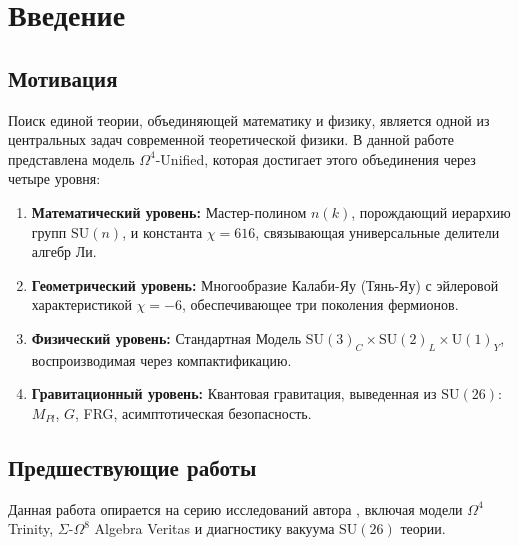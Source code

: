 \documentclass[12pt,a4paper,twoside]{article}
\newcommand{\SU}{\mathrm{SU}}
\newcommand{\Uone}{\mathrm{U}(1)}
\theoremstyle{definition}
\begin{document}
\newpage

\tableofcontents
\newpage

\section{Введение}
\label{sec:intro}

\subsection{Мотивация}

Поиск единой теории, объединяющей математику и физику, является одной из центральных задач современной теоретической физики. В данной работе представлена модель $\Omega^4$-Unified, которая достигает этого объединения через четыре уровня:

\begin{enumerate}
    \item \textbf{Математический уровень:} Мастер-полином $n(k)$, порождающий иерархию групп $\SU(n)$, и константа $\chi = 616$, связывающая универсальные делители алгебр Ли.
    
    \item \textbf{Геометрический уровень:} Многообразие Калаби-Яу (Тянь-Яу) с эйлеровой характеристикой $\chi = -6$, обеспечивающее три поколения фермионов.
    
    \item \textbf{Физический уровень:} Стандартная Модель $\SU(3)_C \times \SU(2)_L \times \Uone_Y$, воспроизводимая через компактификацию.
    
    \item \textbf{Гравитационный уровень:} Квантовая гравитация, выведенная из $\SU(26)$: $M_{Pl}$, $G$, FRG, асимптотическая безопасность.
\end{enumerate}

\subsection{Предшествующие работы}

Данная работа опирается на серию исследований автора \cite{Matershov:2026a, Matershov:2026b, Matershov:2026c, Matershov:2026d, Matershov:2026e}, включая модели $\Omega^4$ Trinity, $\Sigma$-$\Omega^8$ Algebra Veritas и диагностику вакуума $\SU(26)$ теории.
\end{document}
